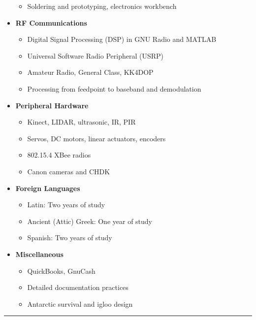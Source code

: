 \documentclass[10pt,letterpaper]{article}
\begin{document}
\begin{itemize}
\begin{itemize}
            \item Soldering and prototyping, electronics workbench
        \end{itemize}
    \item \textbf{RF Communications}
        \begin{itemize}
            \item Digital Signal Processing (DSP) in GNU Radio and MATLAB
            \item Universal Software Radio Peripheral (USRP)
            \item Amateur Radio, General Class, KK4DOP
            \item Processing from feedpoint to baseband and demodulation
        \end{itemize}
    \item \textbf{Peripheral Hardware}
        \begin{itemize}
            \item Kinect, LIDAR, ultrasonic, IR, PIR
            \item Servos, DC motors, linear actuators, encoders
            \item 802.15.4 XBee radios
            \item Canon cameras and CHDK
        \end{itemize}
    \item \textbf{Foreign Languages}
        \begin{itemize}
            \item Latin: Two years of study
            \item Ancient (Attic) Greek: One year of study
            \item Spanish: Two years of study
        \end{itemize}
    \item \textbf{Miscellaneous}
        \begin{itemize}
            \item QuickBooks, GnuCash
            \item Detailed documentation practices
            \item Antarctic survival and igloo design
        \end{itemize}
\end{itemize}

\vspace{2pt}
\hrule
\vspace{-0.4em}
\end{document}
